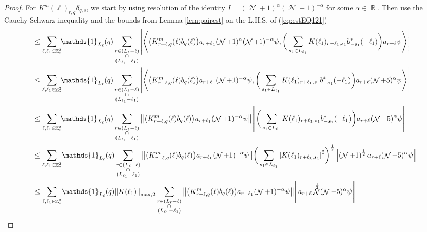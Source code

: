\documentclass[sn-mathphys, Numbered ,a4paper]{sn-jnl}%
\DeclareMathOperator{\R}{\mathbb{R}}
\DeclareMathOperator{\Z}{\mathbb{Z}}
\DeclareMathOperator{\NN}{\mathcal{N}}
\newcommand{\half}{\frac{1}{2}}
\newcommand{\eva}[1]{\left\langle #1 \right\rangle}
\theoremstyle{plain}
\theoremstyle{definition}
\theoremstyle{remark}
\theoremstyle{plain}
\theoremstyle{definition}
\theoremstyle{remark}
\begin{document}
\begin{proof}
For $ K^m(\ell )_{r,q}\delta_{q,s}$, we start by using resolution of the identity $I = (\NN+1)^{\alpha}(\NN+1)^{-\alpha}$ for some $\alpha \in \R$. Then use the Cauchy-Schwarz inequality and the bounds from Lemma \ref{lem:pairest} on the L.H.S. of (\ref{eq:estEQ121})
\begin{align}
	&\leq \sum\limits_{\ell,\ell_1 \in \Z^3_*}\!\! \mathds{1}_{L_\ell}(q) \sum\limits_{\substack{r \in (L_\ell-\ell) \\ \cap \\ (L_{\ell_1}-\ell_1)}}\abs{\eva{\big(K^{m}_{r+\ell,q}(\ell)b_{q}(\ell)\big) a_{r+\ell_1}(\NN+1)^{\alpha}(\NN+1)^{-\alpha} \psi, \bigg( \sum\limits_{s_1 \in L_{\ell_1}} K(\ell_1)_{r+\ell_1,s_1}b^*_{-s_1}(-\ell_1) \bigg) a_{r+\ell} \psi }}\nonumber\\
	&\leq \sum\limits_{\ell,\ell_1 \in \Z^3_*} \!\!\mathds{1}_{L_\ell}(q) \sum\limits_{\substack{r \in (L_\ell-\ell) \\ \cap \\ (L_{\ell_1}-\ell_1)}}\abs{\eva{\big(K^{m}_{r+\ell,q}(\ell)b_{q}(\ell)\big) a_{r+\ell_1}(\NN+1)^{-\alpha} \psi, \bigg( \sum\limits_{s_1 \in L_{\ell_1}} K(\ell_1)_{r+\ell_1,s_1}b^*_{-s_1}(-\ell_1) \bigg) a_{r+\ell}(\NN+5)^{\alpha} \psi }}\nonumber\\
		&\leq \sum\limits_{\ell,\ell_1 \in \Z^3_*} \!\!\mathds{1}_{L_\ell}(q) \sum\limits_{\substack{r \in (L_\ell-\ell) \\ \cap \\ (L_{\ell_1}-\ell_1)}}\norm{\big(K^{m}_{r+\ell,q}(\ell)b_{q}(\ell)\big) a_{r+\ell_1} (\NN+1)^{-\alpha}\psi}\norm {\bigg( \sum\limits_{s_1 \in L_{\ell_1}} K(\ell_1)_{r+\ell_1,s_1}b^*_{-s_1}(-\ell_1) \bigg) a_{r+\ell} (\NN+5)^{\alpha}\psi }\nonumber\\
		&\leq \sum\limits_{\ell,\ell_1 \in \Z^3_*} \!\mathds{1}_{L_\ell}(q) \sum\limits_{\substack{r \in (L_\ell-\ell) \\ \cap \\ (L_{\ell_1}-\ell_1)}} \norm{\big(K^{m}_{r+\ell,q}(\ell)b_{q}(\ell)\big) a_{r+\ell_1} (\NN+1)^{-\alpha} \psi}\bigg( \sum\limits_{s_1 \in L_{\ell_1}} \abs{K(\ell_1)_{r+\ell_1,s_1}}^2 \bigg)^\half \norm {\left(\NN+1\right)^\half a_{r+\ell} (\NN+5)^{\alpha} \psi }\nonumber\\
		&\leq \sum\limits_{\ell,\ell_1 \in \Z^3_*} \!\mathds{1}_{L_\ell}(q) \norm{K(\ell_1)}_{\mathrm{max},2} \sum\limits_{\substack{r \in (L_\ell-\ell) \\ \cap \\ (L_{\ell_1}-\ell_1)}} \norm{\big(K^{m}_{r+\ell,q}(\ell)b_{q}(\ell)\big) a_{r+\ell_1} (\NN+1)^{-\alpha} \psi} \norm { a_{r+\ell}\NN^\half (\NN+5)^{\alpha} \psi }\nonumber\\

\end{align}
\end{proof}
\end{document}
